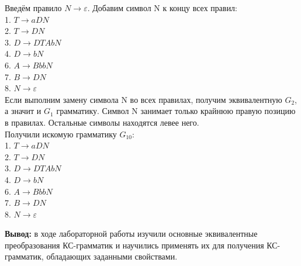 \documentclass[a4paper,14pt]{extarticle}
\begin{document}
\begin{enumerate}[1.]
Введём правило $N \rightarrow \varepsilon$. Добавим символ N к концу всех правил:\\
1. $T \rightarrow aDN$\\
2. $T \rightarrow DN$\\
3. $D \rightarrow DTAbN$\\
4. $D \rightarrow bN$\\
6. $A \rightarrow BbbN$\\
7. $B \rightarrow DN$\\
8. $N \rightarrow \varepsilon$\\
Если выполним замену символа N во всех правилах, получим эквивалентную $G_2$, 
а значит и $G_1$ грамматику. Символ N занимает только крайнюю правую позицию в правилах.
Остальные символы находятся левее него.\\
Получили искомую грамматику $G_{10}$:\\
1. $T \rightarrow aDN$\\
2. $T \rightarrow DN$\\
3. $D \rightarrow DTAbN$\\
4. $D \rightarrow bN$\\
6. $A \rightarrow BbbN$\\
7. $B \rightarrow DN$\\
8. $N \rightarrow \varepsilon$\\
\fi

\end{enumerate}

\textbf{Вывод: } в ходе лабораторной работы изучили основные эквивалентные преобразования
КС-грамматик и научились применять их для получения
КС-грамматик, обладающих заданными свойствами.
\end{document}
